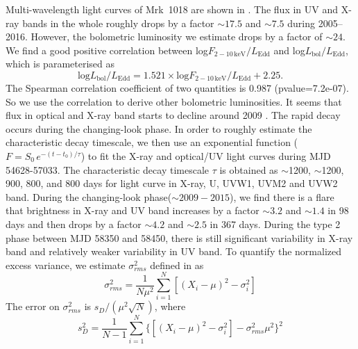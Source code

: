 \documentclass[twocolumn]{aastex63}
\begin{document}
 
Multi-wavelength light curves of Mrk~1018 are shown in . The flux in UV and X-ray bands in the whole roughly drops by a factor $\sim17.5$ and $\sim7.5$ during 2005--2016. However, the bolometric luminosity we estimate drops by a factor of $\sim24$. We find a good positive correlation between log$F_\mathrm{2-10\,keV}/L_\mathrm{Edd}$ and log$L_\mathrm{bol}/L_\mathrm{Edd}$, which is parameterised as 
\begin{equation}\label{Lbol-LX}
\mathrm{log} L_\mathrm{bol}/L_\mathrm{Edd}= 1.521 \times \mathrm{log} F_\mathrm{2-10\,keV}/L_\mathrm{Edd}+2.25.
\end{equation} The Spearman correlation coefficient of two quantities is 0.987 (pvalue=7.2e-07). So we use the correlation to derive other bolometric luminosities. It seems that flux in optical and X-ray band starts to decline around 2009 \citep[see also the optical light curve in ][]{2016A&A...593L...8M}. The rapid decay occurs during the changing-look phase. In order to roughly estimate the characteristic decay timescale, we then use an exponential function ($F=S_0\,e^{-(t-t_0)/\tau }$) to fit the X-ray and optical/UV light curves during MJD 54628-57033. The characteristic decay timescale $\tau$ is obtained as $\sim$1200, $\sim$1200, 900, 800, and 800 days for light curve in X-ray, U, UVW1, UVM2 and UVW2 band. During the changing-look phase($\sim 2009-2015$), we find there is a flare that brightness in X-ray and UV band increases by a factor $\sim3.2$ and $\sim1.4$ in 98 days and then drops by a factor $\sim4.2$ and $\sim2.5$ in 367 days. During the type 2 phase between MJD 58350 and 58450, there is still significant variability in X-ray band and relatively weaker variability in UV band. To quantify the normalized excess variance, we estimate $\sigma^2_{rms} $ defined in \citet{1999ApJ...524..667T} as
\begin{equation}
\sigma^2_{rms}=\frac{1}{N\mu^2}\sum_{i=1}^{N}[(X_i-\mu)^2-\sigma_i^2]
\end{equation}
The error on $\sigma^2_{rms}$ is $s_D/(\mu^2\sqrt{N})$, where \begin{equation}
s_D^2=\frac{1}{N-1}\sum_{i=1}^{N}\{[(X_i-\mu)^2-\sigma_i^2]-\sigma^2_{rms}\mu^2\}^2
\end{equation}

\end{document}

